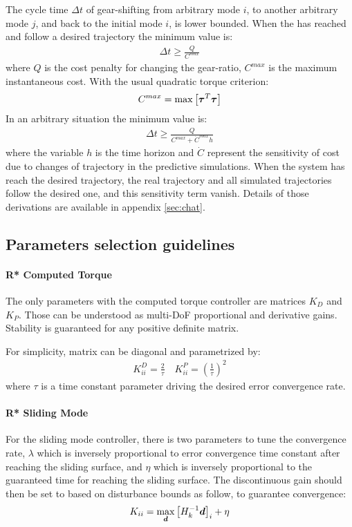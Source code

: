 The cycle time $\Delta t$ of gear-shifting from arbitrary mode $i$, to another arbitrary mode $j$, and back to the initial mode $i$, is lower bounded. When the has reached and follow a desired trajectory the minimum value is:
%
\begin{align}
\Delta t \geq \frac{Q}{C^{max}}
\label{eq:minshifttime}
\end{align}
%
where $Q$ is the cost penalty for changing the gear-ratio, $C^{max}$ is the maximum instantaneous cost. With the usual quadratic torque criterion:
%
\begin{align}
C^{max} = \operatornamewithlimits{max}\left[ \vec{\tau}^T \vec{\tau} \right]
\end{align}
%
In an arbitrary situation the minimum value is:
%
\begin{align}
\Delta t \geq \frac{ Q }{ C^{max} + \dot{C}^{max} h }
\end{align}
%
where the variable $h$ is the time horizon and $\dot{C}$ represent the sensitivity of cost due to changes of trajectory in the predictive simulations. When the system has reach the desired trajectory, the real trajectory and all simulated trajectories follow the desired one, and this sensitivity term vanish. Details of those derivations are available in appendix \ref{sec:chat}.


\subsection{Parameters selection guidelines}

\paragraph{R* Computed Torque} The only parameters with the computed torque controller are matrices $K_D$ and $K_P$. Those can be understood as multi-DoF proportional and derivative gains. Stability is guaranteed for any positive definite matrix.

For simplicity, matrix can be diagonal and parametrized by:
%
\begin{align}
K^D_{ii} = \frac{2}{\tau} \quad   K^P_{ii} = \left(\frac{1}{\tau}\right)^2
\end{align}
%
where $\tau$ is a time constant parameter driving the desired error convergence rate.

\paragraph{R* Sliding Mode} For the sliding mode controller, there is two parameters to tune the convergence rate, $\lambda$ which is inversely proportional to error convergence time constant after reaching the sliding surface, and $\eta$ which is inversely proportional to the guaranteed time for reaching the sliding surface. The discontinuous gain should then be set to based on disturbance bounds as follow, to guarantee convergence:
%
\begin{align}
K_{ii} = \operatornamewithlimits{max}\limits_{\vec{d}} \left[ H_k^{-1} \vec{d} \right]_i + \eta
\end{align}
%

